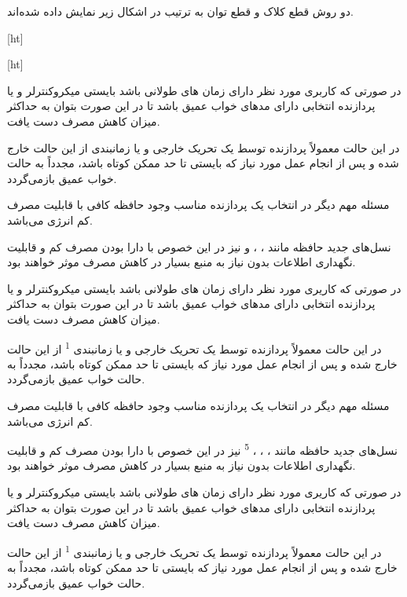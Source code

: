 دو روش قطع کلاک و قطع توان به ترتیب در اشکال زیر نمایش داده شده‌اند. 


[ht]

[ht]

در صورتی که کاربری مورد نظر دارای زمان های  طولانی باشد بایستی میکروکنترلر و یا پردازنده انتخابی دارای مدهای خواب عمیق باشد تا در این صورت بتوان به حداکثر میزان کاهش مصرف دست یافت. 

در این حالت معمولاً پردازنده توسط یک تحریک خارجی و یا زمانبندی  از این حالت خارج شده و پس از انجام عمل مورد نیاز که بایستی تا حد ممکن کوتاه باشد، مجدداً به حالت خواب عمیق بازمی‌گردد.

مسئله مهم دیگر در انتخاب یک پردازنده مناسب وجود حافظه کافی با قابلیت مصرف کم انرژی می‌باشد. 

نسل‌های جدید حافظه مانند ،  ،  و  نیز در این خصوص با دارا بودن مصرف کم و قابلیت نگهداری اطلاعات بدون نیاز به منبع بسیار در کاهش مصرف موثر خواهند بود. 



در صورتی که کاریری مورد نظر دارای زمان های  طولانی باشد بایستی میکروکنترلر و یا پردازنده انتخابی دارای مدهای خواب عمیق باشد تا در این صورت بتوان به حداکثر میزان کاهش مصرف دست یافت.

در این حالت معمولاً پردازنده توسط یک تحریک خارجی و یا زمانبندی \textsuperscript{1} از این حالت خارج شده و پس از انجام عمل مورد نیاز که بایستی تا حد ممکن کوتاه باشد، مجدداً به حالت خواب عمیق بازمی‌گردد.

مسئله مهم دیگر در انتخاب یک پردازنده مناسب وجود حافظه کافی با قابلیت مصرف کم انرژی می‌باشد. 

نسل‌های جدید حافظه مانند ، ، ، \textsuperscript{5} نیز در این خصوص با دارا بودن مصرف کم و قابلیت نگهداری اطلاعات بدون نیاز به منبع بسیار در کاهش مصرف موثر خواهند بود.\lr{[1]}



در صورتی که کاریری مورد نظر دارای زمان های  طولانی باشد بایستی میکروکنترلر و یا پردازنده انتخابی دارای مدهای خواب عمیق باشد تا در این صورت بتوان به حداکثر میزان کاهش مصرف دست یافت. 

در این حالت معمولاً پردازنده توسط یک تحریک خارجی و یا زمانبندی \textsuperscript{1} از این حالت خارج شده و پس از انجام عمل مورد نیاز که بایستی تا حد ممکن کوتاه باشد، مجدداً به حالت خواب عمیق بازمی‌گردد.

